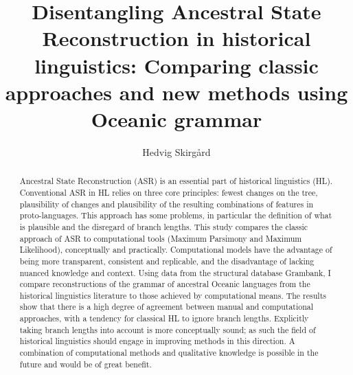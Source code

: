\documentclass[12pt,letterpaper]{article}
\title{Disentangling Ancestral State Reconstruction in historical linguistics: Comparing classic approaches and new methods using Oceanic grammar}
\author[1]{Hedvig Skirgård}
\affil[1]{Department of Linguistic and Cultural Evolution, Max Planck Institute for Evolutionary Anthropology. Leipzig, Germany.}
\begin{document}

\thispagestyle{empty}


\maketitle
\thispagestyle{empty}





\begin{abstract}

Ancestral State Reconstruction (ASR) is an essential part of historical linguistics (HL). Conventional ASR in HL relies on three core principles: fewest changes on the tree,  plausibility of changes and plausibility of the resulting combinations of features in proto-languages. This approach has some problems, in particular the definition of what is plausible and the disregard of branch lengths. This study compares the classic approach of ASR to computational tools (Maximum Parsimony and Maximum Likelihood), conceptually and practically. Computational models have the advantage of being more transparent, consistent and replicable, and the disadvantage of lacking nuanced knowledge and context. Using data from the structural database Grambank, I compare reconstructions of the grammar of ancestral Oceanic languages from the historical linguistics literature to those achieved by computational means. The results show that there is a high degree of agreement between manual and computational approaches, with a tendency for classical HL to ignore branch lengths. Explicitly taking branch lengths into account is more conceptually sound; as such the field of historical linguistics should engage in improving methods in this direction. A combination of computational methods and qualitative knowledge is possible in the future and would be of great benefit.


\end{abstract}
\end{document}

